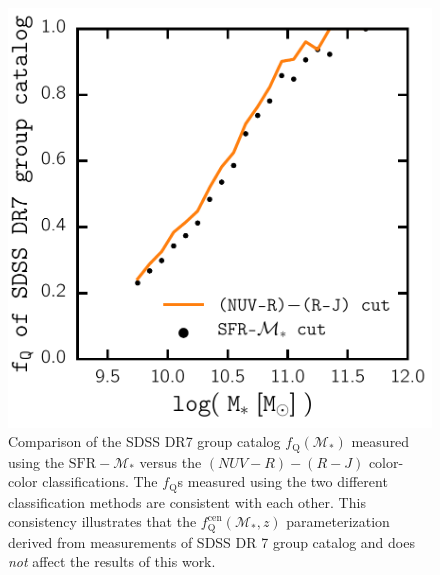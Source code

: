 \documentclass[iop,apj,tighten,twocolappendix,numberedappendix]{emulateapj}
\newcommand{\fq}{f_\mathrm{Q}}
\newcommand{\fqcen}{f_\mathrm{Q}^\mathrm{cen}}
\begin{document}
\begin{figure}
\begin{center}
\includegraphics[scale=0.5]{figs/fq_colorcolor.pdf}
\caption{Comparison of the SDSS DR7 group catalog $\fq(\mathcal{M}_*)$ 
measured using the $\mathrm{SFR} - \mathcal{M}_*$ versus the 
$(NUV - R) - (R - J)$ color-color classifications. The $\fq$s 
measured using the two different classification methods are
consistent with each other. This consistency illustrates that 
the $\fqcen(\mathcal{M}_*, z)$ parameterization derived from 
measurements of SDSS DR 7 group catalog and \cite{Tinker:2013aa} 
does {\em not} affect the results of this work.}
\label{fig:fq_colorcolor}
\end{center}
\end{figure}



\end{document}
